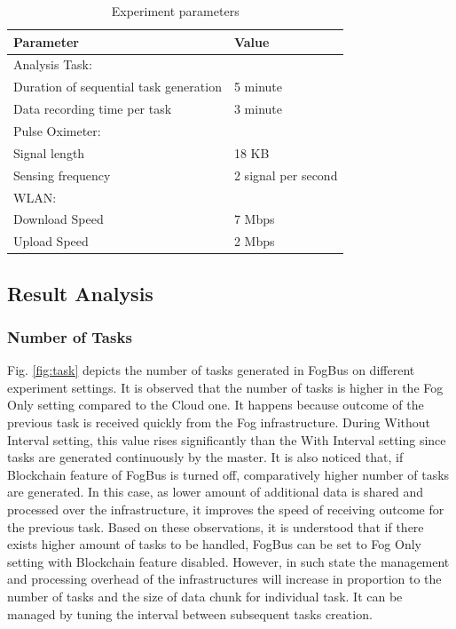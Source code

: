 \documentclass[final,5p,times,twocolumn]{elsarticle}
\begin{document}
\begin{table}[!h]
\centering
\scriptsize
\caption{Experiment parameters}\label{Tab.sim}
\begin{tabular}{|p{4.5cm}|p{2cm}|}
\hline
    Parameter & Value \\ \hline
    Analysis Task: & \\
    Duration of sequential task generation & 5 minute \\ 
    Data recording time per task & 3 minute \\ \hline  
    Pulse Oximeter: & \\
    Signal length & 18 KB \\
    Sensing frequency & 2 signal per second \\ \hline 
    WLAN: & \\
    Download Speed & 7 Mbps \\
    Upload Speed & 2 Mbps \\ \hline 
\end{tabular}
\end{table}
%
\subsection{Result Analysis}
\subsubsection{Number of Tasks}
Fig. \ref{fig:task} depicts the number of tasks generated in FogBus on different experiment settings. It is observed that the number of tasks is higher in the Fog Only setting compared to the Cloud one. It happens because outcome of the previous task is received quickly from the Fog infrastructure. During Without Interval setting, this value rises significantly than the With Interval setting since tasks are generated continuously by the master. It is also noticed that, if Blockchain feature of FogBus is turned off, comparatively higher number of tasks are generated. In this case, as lower amount of additional data is shared and processed over the infrastructure, it improves the speed of receiving outcome for the previous task. Based on these observations, it is understood that if there exists higher amount of tasks to be handled, FogBus can be set to Fog Only setting with Blockchain feature disabled. However, in such state the management and processing overhead of the infrastructures will increase in proportion to the number of tasks and the size of data chunk for individual task. It can be managed by tuning the interval between subsequent tasks creation.            
\end{document}
